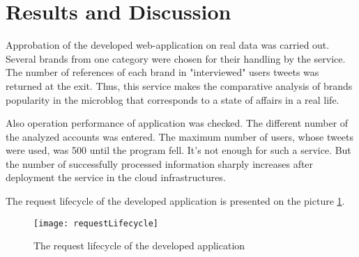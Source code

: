 \section{Results and Discussion}\label{sec:architecture}

Approbation of the developed web-application on real data was carried out. Several brands from one category were chosen for their handling by the service. The number of references of each brand in "interviewed" users tweets was returned at the exit. Thus, this service makes the comparative analysis of brands popularity in the microblog that corresponds to a state of affairs in a real life.

Also operation performance of application was checked. The different number of the analyzed accounts was entered. The maximum number of users, whose tweets were used, was 500 until the program fell. It's not enough for such a service. But the number of successfully processed information sharply increases after deployment the service in the cloud infrastructures.


The request lifecycle of the developed application is presented on the picture \ref {fig:requestLifecycle}.

\begin{figure}[tbh]
\centering
\caption{The request lifecycle of the developed application}
\label{fig:requestLifecycle}
\texttt{[image: requestLifecycle]}
\end{figure}